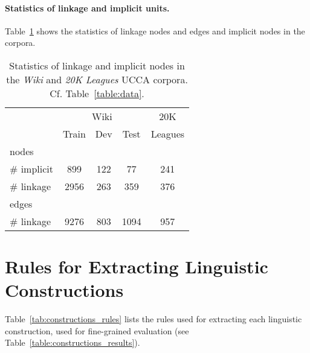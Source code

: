\documentclass[11pt,a4paper]{article}
\newcommand{\tabref}[1]{Table~\ref{#1}}
\begin{document}
\paragraph{Statistics of linkage and implicit units.}

\tabref{table:data_linkage_implicit} shows the statistics of linkage nodes and edges and
implicit nodes in the corpora.

\begin{table}[ht]
\centering
\begin{tabular}{l|ccc|c}
& \multicolumn{3}{c|}{Wiki} & 20K \\
& \small Train & \small Dev & \small Test & Leagues \\
\hline
nodes \\
\# implicit & 899 & 122 & 77 & 241 \\
\# linkage & 2956 & 263 & 359 & 376 \\
\hline
edges \\
\# linkage & 9276 & 803 & 1094 & 957
\end{tabular}
\caption{Statistics of linkage and implicit nodes in the
\textit{Wiki} and \textit{20K Leagues} UCCA corpora.
Cf. \tabref{table:data}.
}
\label{table:data_linkage_implicit}
\end{table}

\section{Rules for Extracting Linguistic Constructions}
\label{appendix:constructions}

\tabref{tab:constructions_rules} lists the rules used for extracting each linguistic
construction, used for fine-grained evaluation (see \tabref{table:constructions_results}).
\end{document}
